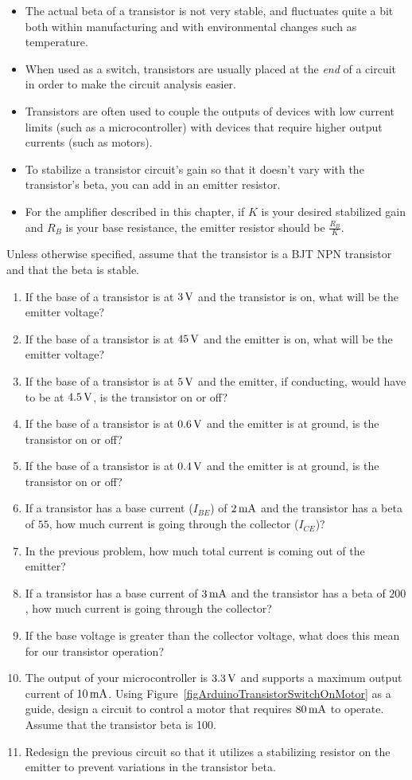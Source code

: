 \begin{itemize}
\item The actual beta of a transistor is not very stable, and fluctuates quite a bit both within manufacturing and with environmental changes such as temperature.
\item When used as a switch, transistors are usually placed at the \emph{end} of a circuit in order to make the circuit analysis easier.
\item Transistors are often used to couple the outputs of devices with low current limits (such as a microcontroller) with devices that require higher output currents (such as motors).
\item To stabilize a transistor circuit's gain so that it doesn't vary with the transistor's beta, you can add in an emitter resistor.
\item For the amplifier described in this chapter, if $K$ is your desired stabilized gain and $R_B$ is your base resistance, the emitter resistor should be $\frac{R_B}{K}$.
\end{itemize}

\applysection

Unless otherwise specified, assume that the transistor is a BJT NPN transistor and that the beta is stable.

\begin{enumerate}
\item If the base of a transistor is at $3\,\si{\volt}$ and the transistor is on, what will be the emitter voltage?
\item If the base of a transistor is at $45\,\si{\volt}$ and the emitter is on, what will be the emitter voltage?
\item If the base of a transistor is at $5\,\si{\volt}$ and the emitter, if conducting, would have to be at $4.5\,\si{\volt}$, is the transistor on or off?
\item If the base of a transistor is at $0.6\,\si{\volt}$ and the emitter is at ground, is the transistor on or off?
\item If the base of a transistor is at $0.4\,\si{\volt}$ and the emitter is at ground, is the transistor on or off?
\item If a transistor has a base current ($I_{BE}$) of $2\,\si{\milli\ampere}$ and the transistor has a beta of $55$, how much current is going through the collector ($I_{CE}$)?
\item In the previous problem, how much total current is coming out of the emitter?
\item If a transistor has a base current of $3\,\si{\milli\ampere}$ and the transistor has a beta of $200$, how much current is going through the collector?
\item If the base voltage is greater than the collector voltage, what does this mean for our transistor operation?
\item The output of your microcontroller is $3.3\,\si{\volt}$ and supports a maximum output current of $10\,\si{\milli\ampere}$.  Using Figure~\ref{figArduinoTransistorSwitchOnMotor} as a guide, design a circuit to control a motor that requires $80\,\si{\milli\ampere}$ to operate.  Assume that the transistor beta is 100.
\item Redesign the previous circuit so that it utilizes a stabilizing resistor on the emitter to prevent variations in the transistor beta.
\end{enumerate}
